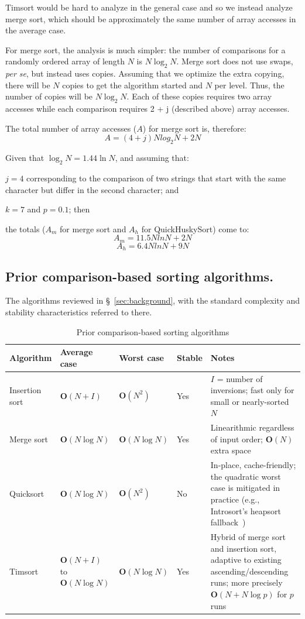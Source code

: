 \documentclass[twoside,leqno,twocolumn]{article}
\begin{document}
Timsort would be hard to analyze in the general case and so we instead analyze merge sort,
which should be approximately the same number of array accesses in the average case.
 
For merge sort, the analysis is much simpler:
the number of comparisons for a randomly ordered array of length $N$ is $N \log_2 N$.
Merge sort does not use swaps, \emph{per se}, but instead uses copies.
Assuming that we optimize the extra copying, there will be $N$ copies to get the algorithm started and $N$ per level.
Thus, the number of copies will be $N {\log_2 N}$.
Each of these copies requires two array accesses while each comparison requires 2 + j (described above) array accesses.
 
The total number of array accesses ($A$) for merge sort is, therefore:
\[A = (4 + j) N log_2 N + 2 N\]
 
Given that $\log_2 N = 1.44 \ln N$, and assuming that:

$j = 4$ corresponding to the comparison of two strings that start with the same character but differ in the second character; and

$k = 7$ and $p = 0.1$; then

the totals ($A_m$ for merge sort and $A_h$ for QuickHuskySort) come to:
 \[A_m = 11.5 N ln N + 2 N\]
 \[A_h = 6.4 N ln N + 9 N\]

\subsection{Prior comparison-based sorting algorithms.}
\label{sec:prior-algorithms}

The algorithms reviewed in \S~\ref{sec:background}, with the standard complexity and stability
characteristics referred to there.

\begin{table}
  \caption{Prior comparison-based sorting algorithms}
  \label{tab:PriorAlgorithms}
  \begin{tabularx}{\textwidth}{llllX}
    \toprule
    Algorithm & Average case & Worst case & Stable & Notes \\
    \midrule
    Insertion sort & $\textbf{O}(N + I)$ & $\textbf{O}(N^2)$ & Yes & $I$ = number of inversions; fast only for small or nearly-sorted $N$ \\
    Merge sort & $\textbf{O}(N \log N)$ & $\textbf{O}(N \log N)$ & Yes & Linearithmic regardless of input order; $\textbf{O}(N)$ extra space \\
    Quicksort & $\textbf{O}(N \log N)$ & $\textbf{O}(N^2)$ & No & In-place, cache-friendly; the quadratic worst case is mitigated in practice (e.g., Introsort's heapsort fallback~\cite{doi:10.1002}) \\
    Timsort & $\textbf{O}(N + I)$ to $\textbf{O}(N \log N)$ & $\textbf{O}(N \log N)$ & Yes & Hybrid of merge sort and insertion sort, adaptive to existing ascending/descending runs; more precisely $\textbf{O}(N + N \log p)$ for $p$ runs~\cite{DBLP:journals/corr/abs-1805-08612} \\
    \bottomrule
  \end{tabularx}
\end{table}
\end{document}

